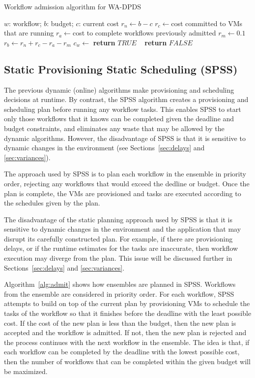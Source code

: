 \documentclass[conference]{IEEEtran}
\begin{document}
\begin{algorithm}[tb]
\caption{Workflow admission algorithm for WA-DPDS}
\label{alg:wa-dpds}
{\footnotesize
\begin{algorithmic}[1]
\Require $w$: workflow; $b$: budget; $c$: current cost
    \State $r_n\gets b-c$ 
    \State $r_c\gets $cost committed to VMs that are running
    \State $r_a\gets $cost to complete workflows previously admitted
  \State $r_m\gets 0.1$ 
  \State $r_b\gets r_n+r_c-r_a-r_m$ 
  \State $c_w\gets$ 
      \textbf{return} $TRUE$
    \Else ~  \textbf{return} $FALSE$
  \EndIf       
\EndProcedure
\end{algorithmic}
}
\end{algorithm}


\subsection{Static Provisioning Static Scheduling (SPSS)}

The previous dynamic (online) algorithms make provisioning and scheduling
decisions at runtime. By contrast, the SPSS algorithm creates a provisioning
and scheduling plan before running any workflow tasks. This enables SPSS to
start only those workflows that it knows can be completed given the deadline and
budget constraints, and eliminates any waste that may be allowed by the dynamic
algorithms. However, the disadvantage of SPSS is that it is sensitive to dynamic
changes in the environment (see Sections~\ref{sec:delays} and
\ref{sec:variances}).

The approach used by SPSS is to plan each workflow in the ensemble in priority
order, rejecting any workflows that would exceed the dedline or budget. Once the
plan is complete, the VMs are provisioned and tasks are executed according to
the schedules given by the plan.

The disadvantage of the static planning approach used by SPSS is that it is
sensitive to dynamic changes in the environment and the application that may
disrupt its carefully constructed plan. For example, if there are provisioning
delays, or if the runtime estimates for the tasks are inaccurate, then workflow
execution may diverge from the plan. This issue will be discussed further in
Sections~\ref{sec:delays} and \ref{sec:variances}.

Algorithm~\ref{alg:admit} shows how ensembles are planned in SPSS. Workflows
from the ensemble are considered in priority order. For each workflow, SPSS
attempts to build on top of the current plan by provisioning VMs to schedule the
tasks of the workflow so that it finishes before the deadline with the least
possible cost. If the cost of the new plan is less than the budget, then the new
plan is accepted and the workflow is admitted. If not, then the new plan is
rejected and the process continues with the next workflow in the ensemble. The
idea is that, if each workflow can be completed by the
deadline with the lowest possible cost, then the number of workflows that can be
completed within the given budget will be maximized.
\end{document}
